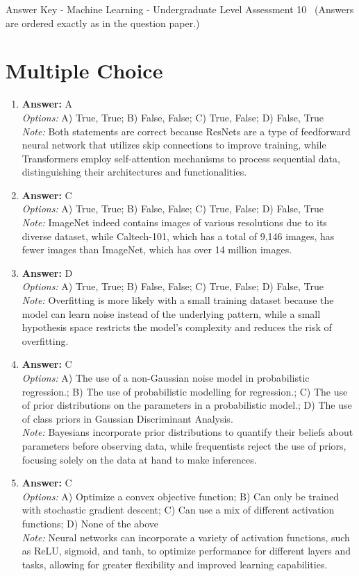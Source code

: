 \documentclass[12pt]{article}
\begin{document}
\begin{center}
Answer Key - Machine Learning - Undergraduate Level Assessment 10 \
\small (Answers are ordered exactly as in the question paper.)
\end{center}

\section*{Multiple Choice}
\begin{enumerate}[label=\arabic*.]
\item \textbf{Answer:} A
\\ \textit{Options:} A) True, True; B) False, False; C) True, False; D) False, True
\\ \textit{Note:} Both statements are correct because ResNets are a type of feedforward neural network that utilizes skip connections to improve training, while Transformers employ self-attention mechanisms to process sequential data, distinguishing their architectures and functionalities.
\item \textbf{Answer:} C
\\ \textit{Options:} A) True, True; B) False, False; C) True, False; D) False, True
\\ \textit{Note:} ImageNet indeed contains images of various resolutions due to its diverse dataset, while Caltech-101, which has a total of 9,146 images, has fewer images than ImageNet, which has over 14 million images.
\item \textbf{Answer:} D
\\ \textit{Options:} A) True, True; B) False, False; C) True, False; D) False, True
\\ \textit{Note:} Overfitting is more likely with a small training dataset because the model can learn noise instead of the underlying pattern, while a small hypothesis space restricts the model's complexity and reduces the risk of overfitting.
\item \textbf{Answer:} C
\\ \textit{Options:} A) The use of a non-Gaussian noise model in probabilistic regression.; B) The use of probabilistic modelling for regression.; C) The use of prior distributions on the parameters in a probabilistic model.; D) The use of class priors in Gaussian Discriminant Analysis.
\\ \textit{Note:} Bayesians incorporate prior distributions to quantify their beliefs about parameters before observing data, while frequentists reject the use of priors, focusing solely on the data at hand to make inferences.
\item \textbf{Answer:} C
\\ \textit{Options:} A) Optimize a convex objective function; B) Can only be trained with stochastic gradient descent; C) Can use a mix of different activation functions; D) None of the above
\\ \textit{Note:} Neural networks can incorporate a variety of activation functions, such as ReLU, sigmoid, and tanh, to optimize performance for different layers and tasks, allowing for greater flexibility and improved learning capabilities.
\end{enumerate}
\end{document}
